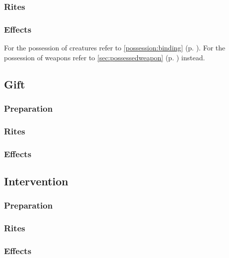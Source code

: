 \subsubsection*{Rites}

\subsubsection*{Effects}
For the possession of creatures refer to \ref{possession:binding} (p. \pageref{possession:binding}).
For the possession of weapons refer to \ref{sec:possessedweapon} (p. \pageref{sec:possessedweapon}) instead.

\subsection*{Gift}
\subsubsection*{Preparation}
\subsubsection*{Rites}
\subsubsection*{Effects}

\subsection*{Intervention}
\subsubsection*{Preparation}
\subsubsection*{Rites}
\subsubsection*{Effects}
